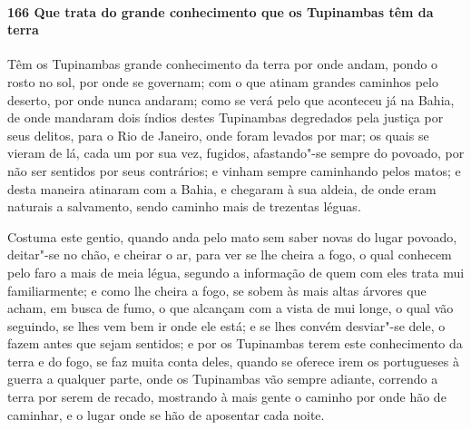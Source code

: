 \begin{linenumbers}
\paragraph{166 Que trata do grande conhecimento que os Tupinambas têm da terra}\quad
Têm os Tupinambas grande conhecimento da terra por onde andam, pondo o rosto no sol, por
onde se governam; com o que atinam grandes caminhos pelo deserto, por onde nunca andaram;
como se verá pelo que aconteceu já na Bahia, de onde mandaram dois índios destes
Tupinambas degredados pela justiça por seus delitos, para o Rio de Janeiro, onde foram
levados por mar; os quais se vieram de lá, cada um por sua vez, fugidos, afastando"-se
sempre do povoado, por não ser sentidos por seus contrários; e vinham sempre caminhando
pelos matos; e desta maneira atinaram com a Bahia, e chegaram à sua aldeia, de onde eram
naturais a salvamento, sendo caminho mais de trezentas léguas.

Costuma este gentio, quando anda pelo mato sem saber novas do lugar povoado, deitar"-se no
chão, e cheirar o ar, para ver se lhe cheira a fogo, o qual conhecem pelo faro a mais de
meia légua, segundo a informação de quem com eles trata mui familiarmente; e como lhe
cheira a fogo, se sobem às mais altas árvores que acham, em busca de fumo, o que alcançam
com a vista de mui longe, o qual vão seguindo, se lhes vem bem ir onde ele está; e se lhes
convém desviar"-se dele, o fazem antes que sejam sentidos; e por os Tupinambas terem este
conhecimento da terra e do fogo, se faz muita conta deles, quando se oferece irem os
portugueses à guerra a qualquer parte, onde os Tupinambas vão sempre adiante, correndo a
terra por serem de recado, mostrando à mais gente o caminho por onde hão de caminhar, e o
lugar onde se hão de aposentar cada noite.


\end{linenumbers}
